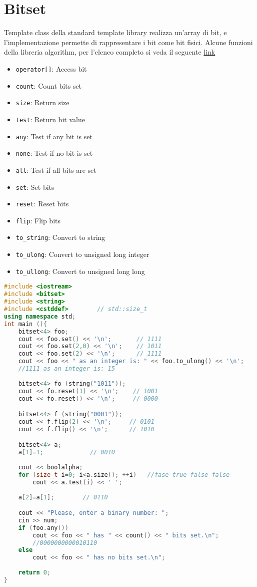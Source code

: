 \section{Bitset}
Template class della standard template library realizza un'array di bit, e l’implementazione permette di rappresentare i bit come bit fisici. 
Alcune funzioni della libreria algorithm, per l’elenco completo si veda il seguente \href{https://cplusplus.com/reference/bitset/bitset/}{link}

\begin{itemize}
    \item \verb|operator[]|: Access bit
    \item \verb|count|: Count bits set
    \item \verb|size|:	Return size 
    \item \verb|test|:	Return bit value
    \item \verb|any|:	Test if any bit is set
    \item \verb|none|:	Test if no bit is set
    \item \verb|all|:	Test if all bits are set
    \item \verb|set|:	Set bits
    \item \verb|reset|:	Reset bits
    \item \verb|flip|:	Flip bits
    \item \verb|to_string|:	Convert to string 
    \item \verb|to_ulong|:	Convert to unsigned long integer
    \item \verb|to_ullong|:	Convert to unsigned long long
\end{itemize}

\begin{lstlisting}[language=C++]
#include <iostream>
#include <bitset> 
#include <string>
#include <cstddef>        // std::size_t
using namespace std;
int main (){
    bitset<4> foo;    
    cout << foo.set() << '\n';       // 1111
    cout << foo.set(2,0) << '\n';    // 1011
    cout << foo.set(2) << '\n';      // 1111
    cout << foo << " as an integer is: " << foo.to_ulong() << '\n';     
    //1111 as an integer is: 15
    
    bitset<4> fo (string("1011"));
    cout << fo.reset(1) << '\n';    // 1001
    cout << fo.reset() << '\n';     // 0000

    bitset<4> f (string("0001"));
    cout << f.flip(2) << '\n';     // 0101
    cout << f.flip() << '\n';      // 1010

    bitset<4> a;
    a[1]=1;             // 0010
    
    cout << boolalpha;
    for (size_t i=0; i<a.size(); ++i)   //fase true false false
        cout << a.test(i) << ' ';
        
    a[2]=a[1];        // 0110

    cout << "Please, enter a binary number: ";
    cin >> num;
    if (foo.any())
        cout << foo << " has " << count() << " bits set.\n";    
        //0000000000010110
    else
        cout << foo << " has no bits set.\n";
    
    return 0;
}

\end{lstlisting}


